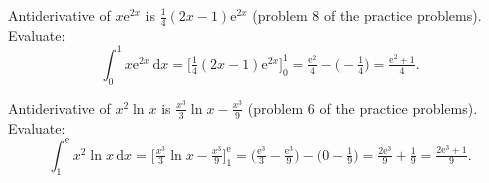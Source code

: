 \begin{solutions}
  \item Antiderivative of $x\mathrm{e}^{2x}$ is $\tfrac14(2x-1)\mathrm{e}^{2x}$
        (problem 8 of the practice problems). Evaluate:
        \[
          \int_{0}^{1} x\mathrm{e}^{2x}\,\mathrm{d}x
            = \bigl[\tfrac14(2x-1)\mathrm{e}^{2x}\bigr]_{0}^{1}
            = \tfrac{\mathrm{e}^{2}}{4}-\bigl(-\tfrac14\bigr)
            = \tfrac{\mathrm{e}^{2}+1}{4} .
        \]

  \item Antiderivative of $x^{2}\ln x$ is $\tfrac{x^{3}}{3}\ln x-\tfrac{x^{3}}{9}$
        (problem 6 of the practice problems). Evaluate:
        \[
          \int_{1}^{\mathrm{e}} x^{2}\ln x\,\mathrm{d}x
            = \bigl[\tfrac{x^{3}}{3}\ln x-\tfrac{x^{3}}{9}\bigr]_{1}^{\mathrm{e}}
            = \bigl(\tfrac{\mathrm{e}^{3}}{3}-\tfrac{\mathrm{e}^{3}}{9}\bigr)
              -\bigl(0-\tfrac19\bigr)
            = \tfrac{2\mathrm{e}^{3}}{9}+\tfrac19
            = \tfrac{2\mathrm{e}^{3}+1}{9} .
        \]
\end{solutions}

